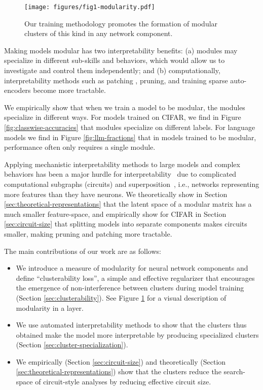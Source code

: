 \begin{figure}[h]
\centering
    \texttt{[image: figures/fig1-modularity.pdf]}
    \caption{Our training methodology promotes the formation of modular clusters of this kind in any network component.}
    \label{fig:fig1}
\end{figure}

Making models modular has two interpretability benefits:
(a) modules may specialize in different sub-skills and behaviors, which would allow us to investigate and control them independently; and (b) computationally, interpretability methods such as patching \cite{wang2022interpretability}, pruning, and training sparse auto-encoders \cite{cunningham2023sparseautoencodershighlyinterpretable} become more tractable.

We empirically show that when we train a model to be modular, the modules specialize in different ways.
For models trained on CIFAR, we find in Figure \ref{fig:classwise-accuracies} that modules specialize on different labels.
For language models we find in Figure \ref{fig:llm-fractions} that in models trained to be modular, performance often only requires a single module.

Applying mechanistic interpretability methods to large models \citep{kaplan2020scaling} and complex behaviors has been a major hurdle for interpretability~\cite{lieberum2023does, golechha2024challenges} due to complicated computational subgraphs (circuits) and superposition~\cite{henighan2023superposition}, i.e., networks representing more features than they have neurons.
We theoretically show in Section \ref{sec:theoretical-representations} that the latent space of a modular matrix has a much smaller feature-space, and empirically show for CIFAR in Section \ref{sec:circuit-size} that splitting models into separate components makes circuits smaller, making pruning and patching \citep{conmy2023towards} more tractable.

The main contributions of our work are as follows:
\begin{itemize}
    \item We introduce a measure of modularity for neural network components and define ``clusterability loss'', a simple and effective regularizer that encourages the emergence of non-interference between clusters during model training (Section \ref{sec:clusterability}). See Figure \ref{fig:fig1} for a visual description of modularity in a layer.
    \item We use automated interpretability methods to show that the clusters thus obtained make the model more interpretable by producing specialized clusters  (Section \ref{sec:cluster-specialization}).
    \item We empirically (Section \ref{sec:circuit-size}) and theoretically (Section \ref{sec:theoretical-representations}) show that the clusters reduce the search-space of circuit-style analyses by reducing effective circuit size.
\end{itemize}

